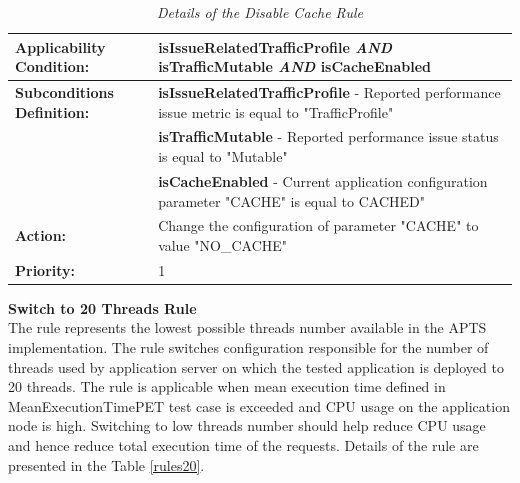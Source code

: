 \documentclass[10pt,a4paper]{article}
\begin{document}
\begin{table}[!htb]
\def\arraystretch{1.5}
\caption{\textit{Details of the Disable Cache Rule}} \label{ruledisablecache}
\begin{tabularx}{\textwidth}{p{2.1cm}|X}

\textbf{Applicability Condition:} & \textbf{isIssueRelatedTrafficProfile} \textit{AND} \newline
\textbf{isTrafficMutable} \textit{AND} \newline
\textbf{isCacheEnabled} \\ \hline

\textbf{Subconditions Definition:} & \textbf{isIssueRelatedTrafficProfile} -  Reported performance issue metric is equal to "TrafficProfile"  \\
& \textbf{isTrafficMutable} - Reported performance issue status is equal to "Mutable" \\
& \textbf{isCacheEnabled} - Current application configuration parameter "CACHE" is equal to CACHED" \\ \hline

\textbf{Action:} & Change the configuration of parameter "CACHE" to value "NO\_CACHE" \\ \hline
\textbf{Priority:} & 1\\
\end{tabularx}
\end{table}
\vspace{5mm}
\noindent\textbf{Switch to 20 Threads Rule} \\
The rule represents the lowest possible threads number available in the APTS implementation. The rule switches configuration responsible for the number of threads used by application server on which the tested application is deployed to 20 threads. The rule is applicable when mean execution time defined in MeanExecutionTimePET test case is exceeded and CPU usage on the application node is high.  Switching to low threads number should help reduce CPU usage and hence reduce total execution time of the requests. Details of the rule are presented in the Table \ref{rules20}.
\end{document}
